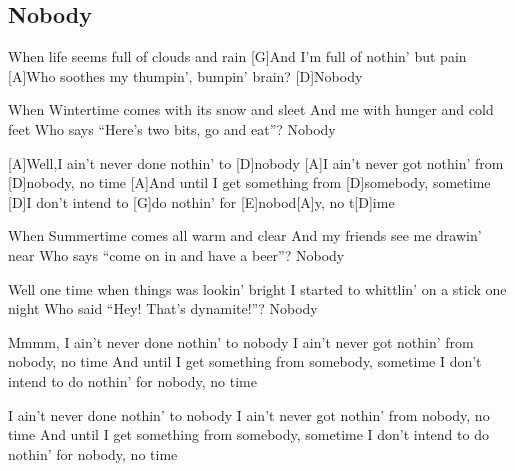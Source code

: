 \subsection*{Nobody   }
\begin{guitar}
[D]When life seems full of clouds and rain
[G]And I'm full of nothin' but pain
[A]Who soothes my thumpin', bumpin' brain?
[D]Nobody

When Wintertime comes with its snow and sleet
And me with hunger and cold feet
Who says ``Here's two bits, go and eat''?
Nobody

[A]Well,I ain't never done nothin' to 
[D]nobody
[A]I ain't never got nothin' from 
[D]nobody, no time
[A]And until I get something from 
[D]somebody, sometime
[D]I don't intend to [G]do nothin' for
[E]nobod[A]y, no t[D]ime

When Summertime comes all warm and clear
And my friends see me drawin' near
Who says ``come on in and have a beer''?
Nobody

Well one time when things was lookin' bright
I started to whittlin' on a stick one night
Who said ``Hey! That's dynamite!''?
Nobody

Mmmm, I ain't never done nothin' to nobody
I ain't never got nothin' from nobody, no time
And until I get something from somebody, sometime
I don't intend to do nothin' for nobody, no time

I ain't never done nothin' to nobody
I ain't never got nothin' from nobody, no time
And until I get something from somebody, sometime
I don't intend to do nothin' for nobody, no time
\end{guitar}
